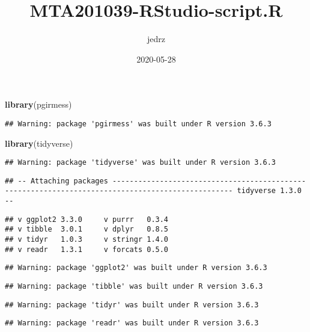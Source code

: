 \documentclass[
]{article}
\title{MTA201039-RStudio-script.R}
\author{jedrz}
\date{2020-05-28}
\newenvironment{Shaded}{\begin{snugshade}}{\end{snugshade}}
\newcommand{\KeywordTok}[1]{\textcolor[rgb]{0.13,0.29,0.53}{\textbf{#1}}}
\newcommand{\NormalTok}[1]{#1}
\begin{document}
\maketitle

\begin{Shaded}
\begin{Highlighting}[]
\KeywordTok{library}\NormalTok{(pgirmess)}
\end{Highlighting}
\end{Shaded}

\begin{verbatim}
## Warning: package 'pgirmess' was built under R version 3.6.3
\end{verbatim}

\begin{Shaded}
\begin{Highlighting}[]
\KeywordTok{library}\NormalTok{(tidyverse)}
\end{Highlighting}
\end{Shaded}

\begin{verbatim}
## Warning: package 'tidyverse' was built under R version 3.6.3
\end{verbatim}

\begin{verbatim}
## -- Attaching packages -------------------------------------------------------------------------------------------------- tidyverse 1.3.0 --
\end{verbatim}

\begin{verbatim}
## v ggplot2 3.3.0     v purrr   0.3.4
## v tibble  3.0.1     v dplyr   0.8.5
## v tidyr   1.0.3     v stringr 1.4.0
## v readr   1.3.1     v forcats 0.5.0
\end{verbatim}

\begin{verbatim}
## Warning: package 'ggplot2' was built under R version 3.6.3
\end{verbatim}

\begin{verbatim}
## Warning: package 'tibble' was built under R version 3.6.3
\end{verbatim}

\begin{verbatim}
## Warning: package 'tidyr' was built under R version 3.6.3
\end{verbatim}

\begin{verbatim}
## Warning: package 'readr' was built under R version 3.6.3
\end{verbatim}
\end{document}
